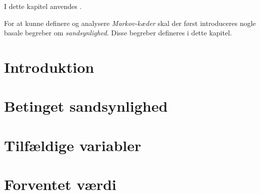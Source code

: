 I dette kapitel anvendes \cite[s. 1-111]{olofsson2005probability}. 

For at kunne definere og analysere \textit{Markov-kæder} skal der først introduceres nogle basale begreber om \textit{sandsynlighed}. Disse begreber defineres i dette kapitel. 

\section{Introduktion}


\section{Betinget sandsynlighed}


\section{Tilfældige variabler}


%

\section{Forventet værdi}



